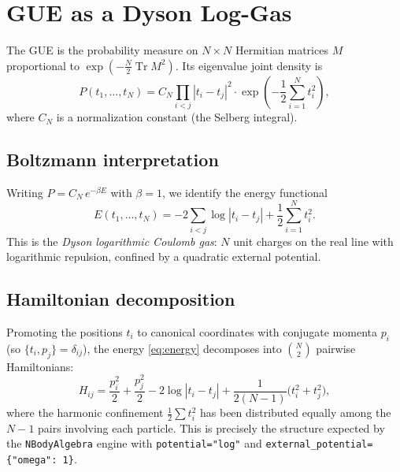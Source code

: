 \documentclass[11pt,a4paper]{article}
\begin{document}
\section{GUE as a Dyson Log-Gas}
\label{sec:gue}

The GUE is the probability measure on $N \times N$ Hermitian matrices
$M$ proportional to $\exp(-\tfrac{N}{2}\operatorname{Tr}M^2)$. Its
eigenvalue joint density is
\begin{equation}\label{eq:gue-density}
  P(t_1, \ldots, t_N) = C_N \prod_{i<j} |t_i - t_j|^2
  \cdot \exp\!\left(-\frac{1}{2}\sum_{i=1}^N t_i^2\right),
\end{equation}
where $C_N$ is a normalization constant (the Selberg integral).

\subsection{Boltzmann interpretation}

Writing $P = C_N \, e^{-\beta E}$ with $\beta = 1$, we identify the
energy functional
\begin{equation}\label{eq:energy}
  E(t_1, \ldots, t_N)
  = -2 \sum_{i<j} \log|t_i - t_j|
    + \frac{1}{2}\sum_{i=1}^N t_i^2.
\end{equation}
This is the \emph{Dyson logarithmic Coulomb gas}: $N$ unit charges on the
real line with logarithmic repulsion, confined by a quadratic external
potential.

\subsection{Hamiltonian decomposition}

Promoting the positions $t_i$ to canonical coordinates with conjugate
momenta $p_i$ (so $\{t_i, p_j\} = \delta_{ij}$), the energy
\eqref{eq:energy} decomposes into $\binom{N}{2}$ pairwise Hamiltonians:
\begin{equation}\label{eq:H-pair}
  H_{ij} = \frac{p_i^2}{2} + \frac{p_j^2}{2}
           - 2\log|t_i - t_j|
           + \frac{1}{2(N-1)}\bigl(t_i^2 + t_j^2\bigr),
\end{equation}
where the harmonic confinement $\frac{1}{2}\sum t_i^2$ has been
distributed equally among the $N-1$ pairs involving each particle. This
is precisely the structure expected by the \texttt{NBodyAlgebra} engine
with \texttt{potential="log"} and
\texttt{external\_potential=\{"omega": 1\}}.

\end{document}
